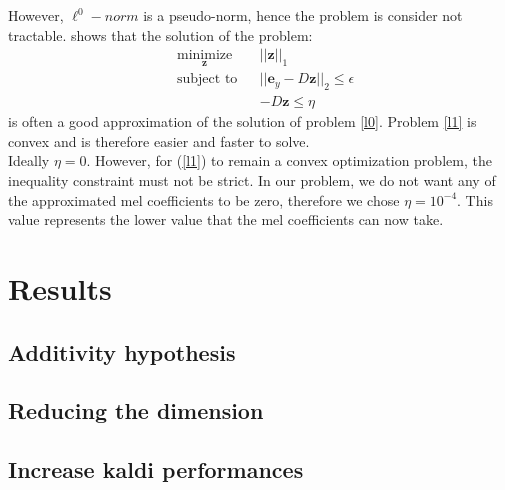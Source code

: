 \documentclass[a4paper]{report}
\newcommand{\ey}{\textbf{e}_y}
\newcommand{\zhat}{ \hat{\textbf{z}} }
\begin{document}

However, $\ell^0-norm$ is a pseudo-norm, hence the problem is consider not tractable. \cite{equivalencel1l0} shows that the solution of the problem:
\begin{equation}
  \begin{aligned}
    & \underset{\mathbf{z}}{\text{minimize}}
    & & ||\mathbf{z}||_1 \\
    & \text{subject to}
    & & ||\ey -D\mathbf{z}||_2 \leq \epsilon\\
    &&& -D\mathbf{z} \leq \eta
  \end{aligned}
\label{l1}
\end{equation}
 is often a good approximation of the solution of problem \ref{l0}. Problem \ref{l1} is convex and is therefore easier and faster to solve.\\
Ideally $\eta = 0$. However, for (\ref{l1}) to remain a convex optimization problem, the inequality constraint must not be strict. In our problem, we do not want any of the approximated mel coefficients to be zero, therefore we chose $\eta = 10^{-4}$. This value represents the lower value that the mel coefficients can now take.


\section{Results}
\subsection{Additivity hypothesis}

\subsection{Reducing the dimension}

\subsection{Increase kaldi performances}


\end{document}
